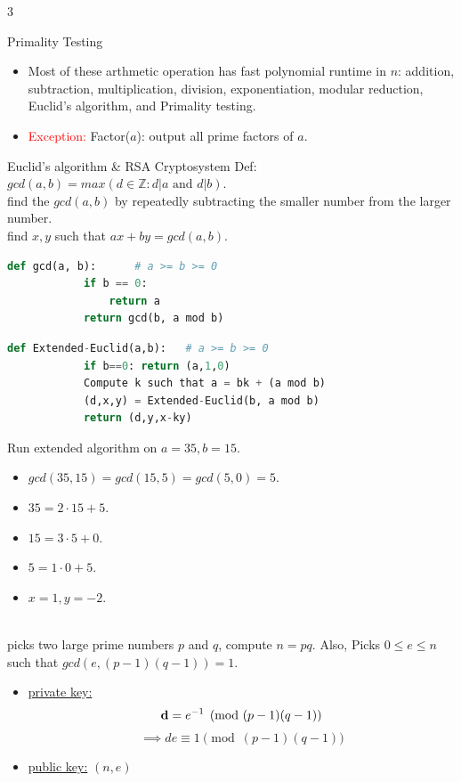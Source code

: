 \documentclass[10pt,a4paper]{article}
\begin{document}
\begin{multicols}{3}
\begin{textbox}{Primality Testing}
    \begin{itemize}
        \item Most of these arthmetic operation has fast 
        polynomial runtime in $n$: addition, subtraction, multiplication, division, exponentiation, modular reduction, Euclid's algorithm, and Primality testing.
        \item \textcolor{red}{Exception:} Factor($a$): output all prime factors of $a$.
    \end{itemize}
    
    
\end{textbox}

\begin{textbox}{Euclid's algorithm \& RSA Cryptosystem}
    Def: $gcd(a, b) = max(d \in \mathbb{Z} : d | a \text{ and } d | b)$.\\
     find the $gcd(a, b)$ by repeatedly subtracting the smaller number from the larger number.\\
    \linebreak
     find $x, y$ such that $ax + by = gcd(a, b)$.\\
    \begin{lstlisting}[language=Python]
        def gcd(a, b):      # a >= b >= 0
            if b == 0:
                return a
            return gcd(b, a mod b)
    \end{lstlisting}

    \begin{lstlisting}[language=Python]
        def Extended-Euclid(a,b): 	# a >= b >= 0
	        if b==0: return (a,1,0)
            Compute k such that a = bk + (a mod b)
            (d,x,y) = Extended-Euclid(b, a mod b)
            return (d,y,x-ky)

    \end{lstlisting}
     Run extended algorithm on $a = 35, b = 15$.
    \begin{itemize}
        \item $gcd(35, 15) = gcd(15, 5) = gcd(5, 0) = 5$.
        \item $35 = 2 \cdot 15 + 5$.
        \item $15 = 3 \cdot 5 + 0$.
        \item $5 = 1 \cdot 0 + 5$.
        \item $x = 1, y = -2$.
    \end{itemize}
     \\
     picks two large prime numbers $p$ and $q$, compute $n = pq$.
    Also, Picks $0 \le e \le n$ such that $gcd(e, (p-1)(q-1)) = 1$.
    \begin{itemize}
        \item \underline{private key:} 
        $${\bf d} = e^{-1} \pmod{(p-1)(q-1)}$$ 
        $$\implies de \equiv 1 \pmod{(p-1)(q-1)}$$
        \item \underline{public key:} $(n, e)$ 
    \end{itemize}


\end{textbox}
\end{multicols}
\end{document}
